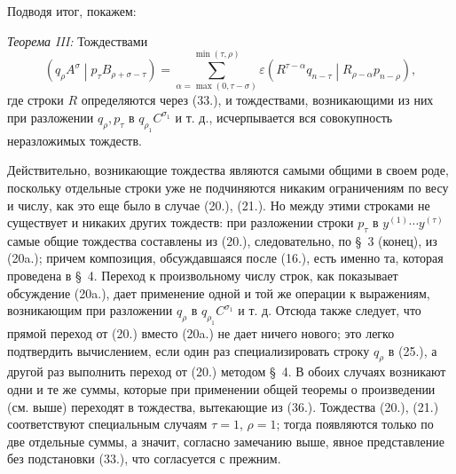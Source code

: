\documentclass[11pt]{article}
\newcommand{\pair}[2]{\left(#1\middle|#2\right)}
\newcommand{\eps}{\varepsilon}
\begin{document}
Подводя итог, покажем:

\emph{Теорема III:} Тождествами
\begin{equation}
 \pair{q_\rho A^\sigma}{p_\tau B_{\rho+\sigma-\tau}}
 =\sum_{\alpha=\max(0,\tau-\sigma)}^{\min(\tau,\rho)}
 \eps\pair{R^{\tau-\alpha}q_{n-\tau}}{R_{\rho-\alpha}p_{n-\rho}},
\tag{36}
\end{equation}
где строки $R$ определяются через (33.), и тождествами, возникающими из них при разложении $q_\rho,p_\tau$ в $q_{\rho_1}C^{\sigma_1}$ и т. д., исчерпывается вся совокупность неразложимых тождеств.

Действительно, возникающие тождества являются самыми общими в своем роде, поскольку отдельные строки уже не подчиняются никаким ограничениям по весу и числу, как это еще было в случае (20.), (21.). Но между этими строками не существует и никаких других тождеств: при разложении строки $p_\tau$ в $y^{(1)}\cdots y^{(\tau)}$ самые общие тождества составлены из (20.), следовательно, по \S\ 3 (конец), из (20a.); причем композиция, обсуждавшаяся после (16.), есть именно та, которая проведена в \S\ 4. Переход к произвольному числу строк, как показывает обсуждение (20a.), дает применение одной и той же операции к выражениям, возникающим при разложении $q_\rho$ в $q_{\rho_1}C^{\sigma_1}$ и т. д. Отсюда также следует, что прямой переход от (20.) вместо (20a.) не дает ничего нового; это легко подтвердить вычислением, если один раз специализировать строку $q_\rho$ в (25.), а другой раз выполнить переход от (20.) методом \S\ 4. В обоих случаях возникают одни и те же суммы, которые при применении общей теоремы о произведении (см. выше) переходят в тождества, вытекающие из (36.). Тождества (20.), (21.) соответствуют специальным случаям $\tau=1$, $\rho=1$; тогда появляются только по две отдельные суммы, а значит, согласно замечанию выше, явное представление без подстановки (33.), что согласуется с прежним.
\end{document}
